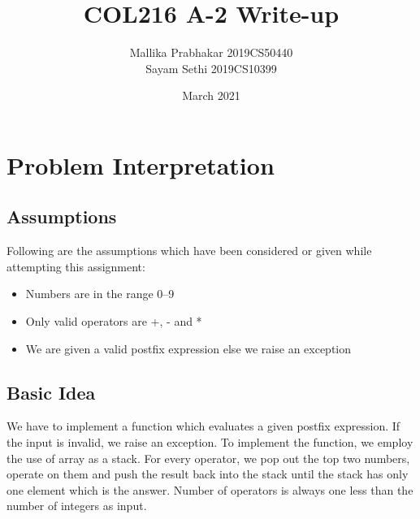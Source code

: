 \documentclass{article}
\title{COL216 A-2 Write-up}
\author{Mallika Prabhakar 2019CS50440 \\ Sayam Sethi 2019CS10399}
\date{March 2021}
\begin{document}
\maketitle

\section*{Problem Interpretation}
 
\subsection*{Assumptions}
Following are the assumptions which have been considered or given while attempting this assignment: 
\begin{itemize}
    \item Numbers are in the range 0--9
    \item Only valid operators are +, - and *
    \item We are given a valid postfix expression else we raise an exception
\end{itemize} 

\subsection*{Basic Idea}
We have to implement a function which evaluates a given postfix expression. If the input is invalid, we raise an exception. To implement the function, we employ the use of array as a stack. For every operator, we pop out the top two numbers, operate on them and push the result back into the stack until the stack has only one element which is the answer. Number of operators is always one less than the number of integers as input.
\end{document}
